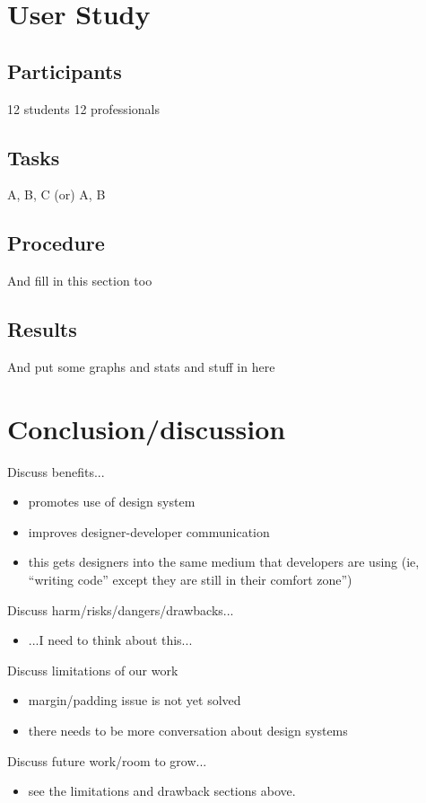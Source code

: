 \documentclass{sigchi}
\begin{document}
\section{User Study}
\subsection{Participants}
12 students
12 professionals

\subsection{Tasks}
A, B, C (or) A, B

\subsection{Procedure}
And fill in this section too

\subsection{Results}
And put some graphs and stats and stuff in here

\section{Conclusion/discussion}
Discuss benefits...
\begin{itemize}
    \item promotes use of design system
    \item improves designer-developer communication
    \item this gets designers into the same medium that developers are using (ie, ``writing code'' except they are still in their comfort zone'')

\end{itemize}

Discuss harm/risks/dangers/drawbacks...
\begin{itemize}
    \item ...I need to think about this...
\end{itemize}

Discuss limitations of our work 
\begin{itemize}
    \item margin/padding issue is not yet solved
    \item there needs to be more conversation about design systems

\end{itemize}

Discuss future work/room to grow...
\begin{itemize}
    \item see the limitations and drawback sections above. 
\end{itemize}


\balance{}



\end{document}
